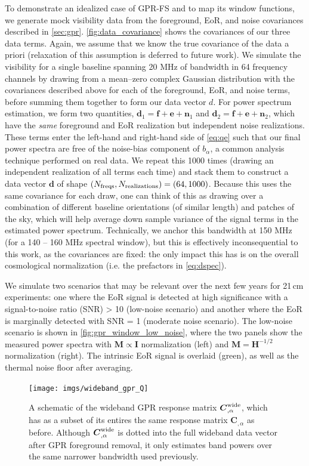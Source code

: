 \documentclass[a4paper,fleqn,usenatbib]{mnras}
\def\d{\boldsymbol{d}}
\def\e{\boldsymbol{e}}
\def\f{\boldsymbol{f}}
\def\H{\boldsymbol{H}}
\def\n{\boldsymbol{n}}
\def\M{\boldsymbol{M}}
\def\C{\boldsymbol{C}}
\def\I{\boldsymbol{I}}
\begin{document}
To demonstrate an idealized case of GPR-FS and to map its window functions, we generate mock visibility data from the foreground, EoR, and noise covariances described in \autoref{sec:gpr}.
\autoref{fig:data_covariance} shows the covariances of our three data terms.
Again, we assume that we know the true covariance of the data a priori (relaxation of this assumption is deferred to future work).
We simulate the visibility for a single baseline spanning 20 MHz of bandwidth in 64 frequency channels by drawing from a mean--zero complex Gaussian distribution with the covariances described above for each of the foreground, EoR, and noise terms, before summing them together to form our data vector $d$.
For power spectrum estimation, we form two quantities, $\d_1 = \f + \e + \n_1$ and $\d_2 = \f + \e + \n_2$, which have the \emph{same} foreground and EoR realization but independent noise realizations.
These terms enter the left-hand and right-hand side of \autoref{eq:qe} such that our final power spectra are free of the noise-bias component of $b_\alpha$, a common analysis technique performed on real data.
We repeat this 1000 times (drawing an independent realization of all terms each time) and stack them to construct a data vector $\d$ of shape $(N_{\rm freqs}, N_{\rm realizations}) = (64, 1000)$.
Because this uses the same covariance for each draw, one can think of this as drawing over a combination of different baseline orientations (of similar length) and patches of the sky, which will help average down sample variance of the signal terms in the estimated power spectrum.
Technically, we anchor this bandwidth at 150 MHz (for a 140 -- 160 MHz spectral window), but this is effectively inconsequential to this work, as the covariances are fixed:
the only impact this has is on the overall cosmological normalization (i.e. the prefactors in \autoref{eq:dspec}).

We simulate two scenarios that may be relevant over the next few years for 21\,cm experiments: one where the EoR signal is detected at high significance with a signal-to-noise ratio (SNR) > 10 (low-noise scenario) and another where the EoR is marginally detected with SNR = 1 (moderate noise scenario).
The low-noise scenario is shown in \autoref{fig:gpr_window_low_noise}, where the two panels show the measured power spectra with $\M\propto\I$ normalization (left) and $\M=\H^{-1/2}$ normalization (right). The intrinsic EoR signal is overlaid (green), as well as the thermal noise floor after averaging.


\begin{figure}
\centering
\texttt{[image: imgs/wideband\_gpr\_Q]}
\caption{A schematic of the wideband GPR response matrix $\C_{,\alpha}^{\rm wide}$, which has as a subset of its entires the same response matrix $\C_{,\alpha}$ as before.
Although $\C^{\rm wide}_{,\alpha}$ is dotted into the full wideband data vector after GPR foreground removal, it only estimates band powers over the same narrower bandwidth used previously.}
\label{fig:wideband_gpr_Q}
\end{figure}
\end{document}
